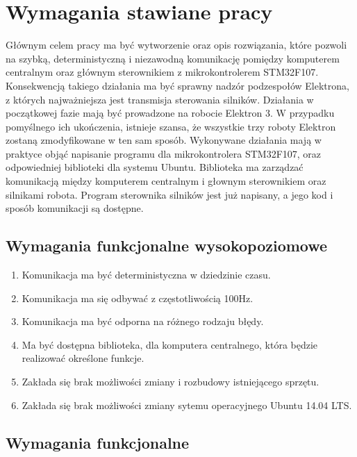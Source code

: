 \documentclass[10pt,a4paper]{article}
\begin{document}
	\section{Wymagania stawiane pracy}
	Głównym celem pracy ma być wytworzenie oraz opis rozwiązania, które pozwoli na szybką, deterministyczną i niezawodną komunikację pomiędzy komputerem centralnym oraz głównym sterownikiem z mikrokontrolerem STM32F107. Konsekwencją takiego działania ma być sprawny nadzór podzespołów Elektrona, z których najważniejsza jest transmisja sterowania silników. Działania w początkowej fazie mają być prowadzone na robocie Elektron 3. W przypadku pomyślnego ich ukończenia, istnieje szansa, że wszystkie trzy roboty Elektron zostaną zmodyfikowane w ten sam sposób. Wykonywane działania mają w praktyce objąć napisanie programu dla mikrokontrolera STM32F107, oraz odpowiedniej biblioteki dla systemu Ubuntu. Biblioteka ma zarządzać komunikacją między komputerem centralnym i głownym sterownikiem oraz silnikami robota. Program sterownika silników jest już napisany, a jego kod i sposób komunikacji są dostępne.
	\subsection{Wymagania funkcjonalne wysokopoziomowe}
	\begin{enumerate}
		\item Komunikacja ma być deterministyczna w dziedzinie czasu.
		\item Komunikacja ma się odbywać z częstotliwością 100Hz.
		\item Komunikacja ma być odporna na różnego rodzaju błędy.
		\item Ma być dostępna biblioteka, dla komputera centralnego, która będzie realizować określone funkcje.
		\item Zakłada się brak możliwości zmiany i rozbudowy istniejącego sprzętu.
		\item Zakłada się brak możliwości zmiany sytemu operacyjnego Ubuntu 14.04 LTS.
	\end{enumerate}
	\subsection{Wymagania funkcjonalne}
\end{document}
